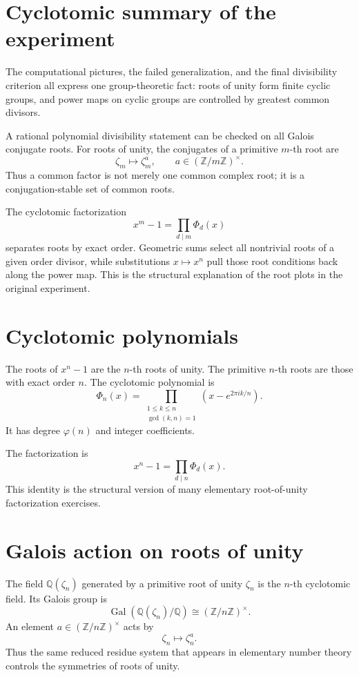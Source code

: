 \section{Cyclotomic summary of the experiment}

The computational pictures, the failed generalization, and the final divisibility criterion all express one group-theoretic fact: roots of unity form finite cyclic groups, and power maps on cyclic groups are controlled by greatest common divisors.

\begin{remark}
A rational polynomial divisibility statement can be checked on all Galois conjugate roots.  For roots of unity, the conjugates of a primitive \(m\)-th root are
\[
  \zeta_m\longmapsto \zeta_m^a,
  \qquad a\in(\mathbb Z/m\mathbb Z)^\times.
\]
Thus a common factor is not merely one common complex root; it is a conjugation-stable set of common roots.
\end{remark}

The cyclotomic factorization
\[
  x^m-1=\prod_{d\mid m}\Phi_d(x)
\]
separates roots by exact order.  Geometric sums select all nontrivial roots of a given order divisor, while substitutions \(x\mapsto x^n\) pull those root conditions back along the power map.  This is the structural explanation of the root plots in the original experiment.

\section{Cyclotomic polynomials}

The roots of $x^n-1$ are the $n$-th roots of unity.  The primitive $n$-th roots are those with exact order $n$.  The cyclotomic polynomial is
\[
  \Phi_n(x)=\prod_{\substack{1\le k\le n\\ \gcd(k,n)=1}}(x-e^{2\pi i k/n}).
\]
It has degree $\varphi(n)$ and integer coefficients.

The factorization is
\[
  x^n-1=\prod_{d\mid n}\Phi_d(x).
\]
This identity is the structural version of many elementary root-of-unity factorization exercises.

\section{Galois action on roots of unity}

The field $\mathbb Q(\zeta_n)$ generated by a primitive root of unity $\zeta_n$ is the $n$-th cyclotomic field.  Its Galois group is
\[
  \operatorname{Gal}(\mathbb Q(\zeta_n)/\mathbb Q)\cong(\mathbb Z/n\mathbb Z)^\times.
\]
An element $a\in(\mathbb Z/n\mathbb Z)^\times$ acts by
\[
  \zeta_n\mapsto \zeta_n^a.
\]
Thus the same reduced residue system that appears in elementary number theory controls the symmetries of roots of unity.

